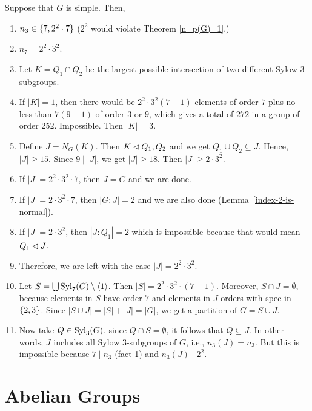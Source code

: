 \begin{solution} Suppose that $G$ is simple. Then,

\begin{enumerate}[\upshape1.]
    \item $n_3\in\{7,2^2\cdot7\}$ ($2^2$ would violate Theorem \ref{n_p(G)=1}.)
    \item $n_7=2^2\cdot3^2$.
    \item Let $K=Q_1\cap Q_2$ be the largest possible intersection of two different Sylow $3$-subgroups.
    \item If $|K|=1$, then there would be $2^2\cdot3^2(7-1)$ elements of order $7$ plus no less than $7(9-1)$ of order $3$ or $9$, which gives a total of $272$ in a group of order $252$. Impossible. Then $|K|=3$.
    \item Define $J=N_G(K)$. Then $K\lhd Q_1,Q_2$ and we get $Q_1\cup Q_2\subseteq J$. Hence, $|J|\ge 15$. Since $9\mid|J|$, we get $|J|\ge18$. Then $|J|\ge2\cdot3^2$.
    \item If $|J|=2^2\cdot3^2\cdot7$, then $J=G$ and we are done.
    \item If $|J|=2\cdot3^2\cdot7$, then $|G:J|=2$ and we are also done (Lemma~\ref{index-2-is-normal}).
    \item If $|J|=2\cdot3^2$, then $|J:Q_1|=2$ which is impossible because that would mean $Q_1\lhd J$.
    \item Therefore, we are left with the case $|J|=2^2\cdot3^2$.
    \item Let $S=\bigcup{\rm Syl}_7(G)\setminus\langle1\rangle$. Then $|S|=2^2\cdot3^2\cdot(7-1)$. Moreover, $S\cap J=\emptyset$, because elements in $S$ have order $7$ and elements in $J$ orders with spec in $\{2,3\}$. Since $|S\cup J|=|S|+|J|=|G|$, we get a partition of $G=S\cup J$.
    \item Now take $Q\in{\rm Syl}_3(G)$, since $Q\cap S=\emptyset$, it follows that $Q\subseteq J$. In other words, $J$ includes all Sylow $3$-subgroups of $G$, i.e., $n_3(J)=n_3$. But this is impossible because $7\mid n_3$ (fact 1) and $n_3(J)\mid2^2$.
\end{enumerate}
\end{solution}

\section{Abelian Groups}

